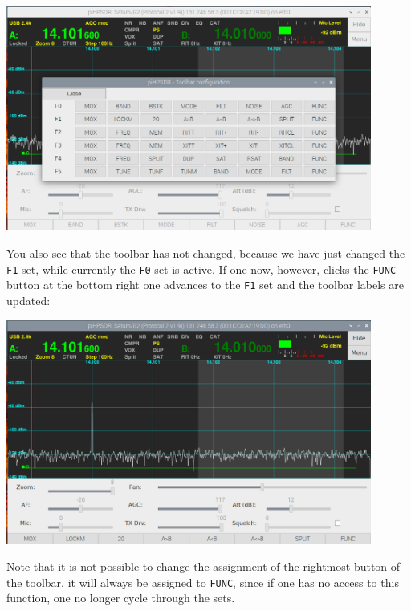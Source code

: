 \documentclass[12pt]{book}
\begin{document}
\begin{center}
\includegraphics[width=12cm]{ToolbarMenu4.png}
\end{center}
You also see that the toolbar has not changed, because we have just changed the \texttt{F1} set,
while currently the \texttt{F0} set is active. If one now, however, clicks the \texttt{FUNC}
button at the bottom right one advances to the \texttt{F1} set and the toolbar labels
are updated: 

\begin{center}
\includegraphics[width=12cm]{ToolbarMenu5.png}
\end{center}

Note that it is not possible to change the assignment of the  rightmost button of the toolbar,
it will always be assigned to \texttt{FUNC}, since if one has no access to this
function, one no longer cycle through the sets.
\end{document}
